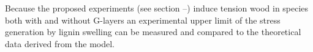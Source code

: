 Because the proposed experiments (see section --) induce tension wood in species
both with and without G-layers an experimental upper limit of the stress
generation by lignin swelling can be measured and
compared to the theoretical data derived from the model.
